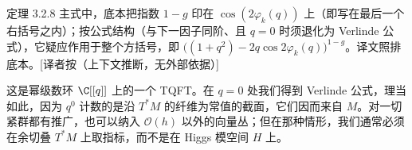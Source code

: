 \begin{annote}
定理 3.2.8 主式中，底本把指数 $1-g$ 印在 $\cos(2\varphi_k(q))$ 上（即写在最后一个右括号之内）；按公式结构（与下一因子同阶、且 $q=0$ 时须退化为 Verlinde 公式），它疑应作用于整个方括号，即 $\bigl((1+q^2)-2q\cos 2\varphi_k(q)\bigr)^{1-g}$。译文照排底本。[译者按（上下文推断，无外部依据）]
\end{annote}

这是幂级数环 $\C[[q]]$ 上的一个 TQFT。在 $q=0$ 处我们得到 Verlinde 公式，理当如此，因为 $q^0$ 计数的是沿 $T^*M$ 的纤维为常值的截面，它们因而来自 $M$。对一切紧群都有推广，也可以纳入 $\mathcal{O}(h)$ 以外的向量丛；但在那种情形，我们通常必须在余切叠 $T^*M$ 上取指标，而不是在 Higgs 模空间 $H$ 上。
